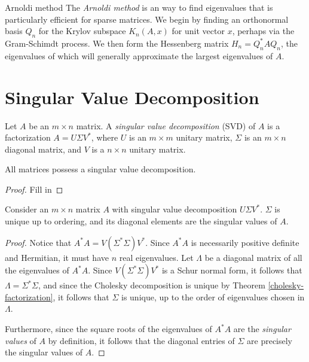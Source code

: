 \begin{defn}{Arnoldi method}\proofbreak
    The \emph{Arnoldi method} is an way to find eigenvalues that is particularly efficient for sparse matrices. We begin by finding an orthonormal basis $Q_n$ for the Krylov subspace $K_n(A, x)$ for unit vector $x$, perhaps via the Gram-Schimdt process. We then form the Hessenberg matrix $H_n = Q_n^{*}AQ_n$, the eigenvalues of which will generally approximate the largest eigenvalues of $A$.
\end{defn}

\section{Singular Value Decomposition}

\begin{defn}
    Let $A$ be an $m \times n$ matrix. A \emph{singular value decomposition} (SVD) of $A$ is a factorization $A = U\Sigma V^{*}$, where $U$ is an $m \times m$ unitary matrix, $\Sigma$ is an $m \times n$ diagonal matrix, and $V$ is a $n \times n$ unitary matrix.
\end{defn}

\begin{thm}
    All matrices possess a singular value decomposition.
\end{thm}

\begin{proof}
    {\color{red}Fill in}
\end{proof}

\begin{prop}
    Consider an $m \times n$ matrix $A$ with singular value decomposition $U\Sigma V^{*}$. $\Sigma$ is unique up to ordering, and its diagonal elements are the singular values of $A$.
\end{prop}

\begin{proof}
    Notice that $A^{*}A = V(\Sigma^{*}\Sigma)V^{*}$. Since $A^{*}A$ is necessarily positive definite and Hermitian, it must have $n$ real eigenvalues. Let $\Lambda$ be a diagonal matrix of all the eigenvalues of $A^{*}A$. Since $V(\Sigma^{*}\Sigma)V^{*}$ is a Schur normal form, it follows that $\Lambda = \Sigma^{*}\Sigma$, and since the Cholesky decomposition is unique by Theorem \ref{cholesky-factorization}, it follows that $\Sigma$ is unique, up to the order of eigenvalues chosen in $\Lambda$.

    Furthermore, since the square roots of the eigenvalues of $A^{*}A$ are the \emph{singular values} of $A$ by definition, it follows that the diagonal entries of $\Sigma$ are precisely the singular values of $A$.
\end{proof}

